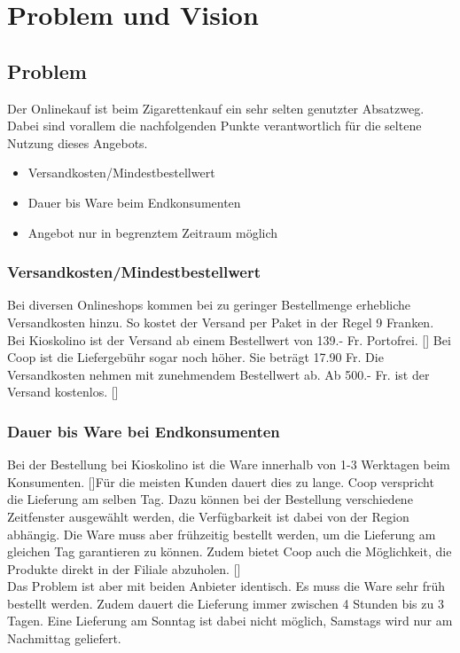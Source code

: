 \section{Problem und Vision}\label{Problem}
\subsection{Problem}
Der Onlinekauf ist beim Zigarettenkauf ein sehr selten genutzter Absatzweg. Dabei sind vorallem die nachfolgenden Punkte verantwortlich für die seltene Nutzung dieses Angebots. 
\begin{itemize}
	\item Versandkosten/Mindestbestellwert
	\item Dauer bis Ware beim Endkonsumenten
	\item Angebot nur in begrenztem Zeitraum möglich
\end{itemize}

\subsubsection{Versandkosten/Mindestbestellwert}
Bei diversen Onlineshops kommen bei zu geringer Bestellmenge erhebliche Versandkosten hinzu. So kostet der Versand per Paket in der Regel 9 Franken. Bei Kioskolino ist der Versand ab einem Bestellwert von 139.- Fr. Portofrei. [\cite{kioskolino}]
Bei Coop ist die Liefergebühr sogar noch höher. Sie beträgt 17.90 Fr. Die Versandkosten nehmen mit zunehmendem Bestellwert ab. Ab 500.- Fr. ist der Versand kostenlos. [\cite{coop}]
\subsubsection{Dauer bis Ware bei Endkonsumenten}
Bei der Bestellung bei Kioskolino ist die Ware innerhalb von 1-3 Werktagen beim Konsumenten. [\cite{kioskolino}]Für die meisten Kunden dauert dies zu lange. 
Coop verspricht die Lieferung am selben Tag. Dazu können bei der Bestellung verschiedene Zeitfenster ausgewählt werden, die Verfügbarkeit ist dabei von der Region abhängig. Die Ware muss aber frühzeitig bestellt werden, um die Lieferung am gleichen Tag garantieren zu können. Zudem bietet Coop auch die Möglichkeit, die Produkte direkt in der Filiale abzuholen. [\cite{coop}]\\
Das Problem ist aber mit beiden Anbieter identisch. Es muss die Ware sehr früh bestellt werden. Zudem dauert die Lieferung immer zwischen 4 Stunden bis zu 3 Tagen. Eine Lieferung am Sonntag ist dabei nicht möglich, Samstags wird nur am Nachmittag geliefert. 

